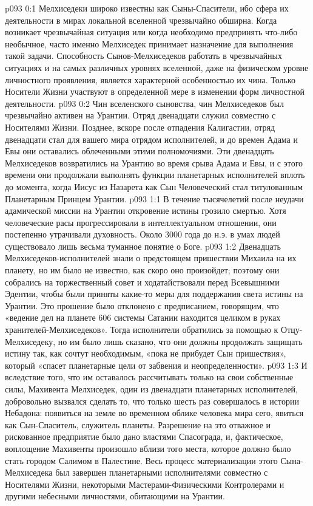\author{Мелхиседек}
\vs p093 0:1 Мелхиседеки широко известны как Сыны\hyp{}Спасители, ибо сфера их деятельности в мирах локальной вселенной чрезвычайно обширна. Когда возникает чрезвычайная ситуация или когда необходимо предпринять что\hyp{}либо необычное, часто именно Мелхиседек принимает назначение для выполнения такой задачи. Способность Сынов\hyp{}Мелхиседеков работать в чрезвычайных ситуациях и на самых различных уровнях вселенной, даже на физическом уровне личностного проявления, является характерной особенностью их чина. Только Носители Жизни участвуют в определенной мере в изменении форм личностной деятельности.
\vs p093 0:2 \pc Чин вселенского сыновства, чин Мелхиседеков был чрезвычайно активен на Урантии. Отряд двенадцати служил совместно с Носителями Жизни. Позднее, вскоре после отпадения Калигастии, отряд двенадцати стал для вашего мира отрядом исполнителей, и до времен Адама и Евы они оставались облеченными этими полномочиями. Эти двенадцать Мелхиседеков возвратились на Урантию во время срыва Адама и Евы, и с этого времени они продолжали выполнять функции планетарных исполнителей вплоть до момента, когда Иисус из Назарета как Сын Человеческий стал титулованным Планетарным Принцем Урантии.
\vs p093 1:1 В течение тысячелетий после неудачи адамической миссии на Урантии откровение истины грозило смертью. Хотя человеческие расы прогрессировали в интеллектуальном отношении, они постепенно утрачивали духовность. Около 3000 года до н.э. в умах людей существовало лишь весьма туманное понятие о Боге.
\vs p093 1:2 Двенадцать Мелхиседеков\hyp{}исполнителей знали о предстоящем пришествии Михаила на их планету, но им было не известно, как скоро оно произойдет; поэтому они собрались на торжественный совет и ходатайствовали перед Всевышними Эдентии, чтобы были приняты какие\hyp{}то меры для поддержания света истины на Урантии. Это прошение было отклонено с предписанием, говорящим, что «ведение дел на планете 606 системы Сатании находится целиком в руках хранителей\hyp{}Мелхиседеков». Тогда исполнители обратились за помощью к Отцу\hyp{}Мелхиседеку, но им было лишь сказано, что они должны продолжать защищать истину так, как сочтут необходимым, «пока не прибудет Сын пришествия», который «спасет планетарные цели от забвения и неопределенности».
\vs p093 1:3 И вследствие того, что им оставалось рассчитывать только на свои собственные силы, Махивента Мелхиседек, один из двенадцати планетарных исполнителей, добровольно вызвался сделать то, что только шесть раз совершалось в истории Небадона: появиться на земле во временном облике человека мира сего, явиться как Сын\hyp{}Спаситель, служитель планеты. Разрешение на это отважное и рискованное предприятие было дано властями Спасограда, и, фактическое, воплощение Махивенты произошло вблизи того места, которое должно было стать городом Салимом в Палестине. Весь процесс материализации этого Сына\hyp{}Мелхиседека был завершен планетарными исполнителями совместно с Носителями Жизни, некоторыми Мастерами\hyp{}Физическими Контролерами и другими небесными личностями, обитающими на Урантии.
